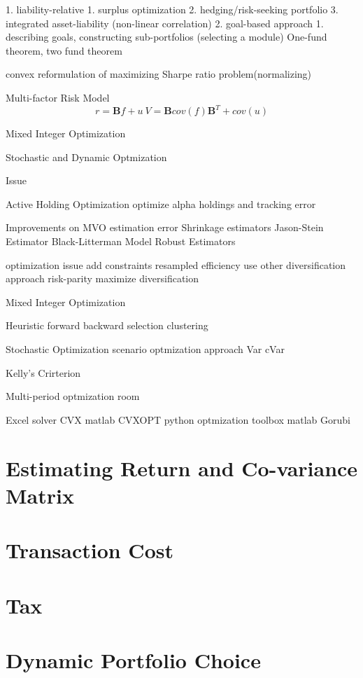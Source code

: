 \documentclass[11pt, openany]{book}              %
\begin{document}
    1. liability-relative
        1. surplus optimization
        2. hedging/risk-seeking portfolio
        3. integrated asset-liability (non-linear correlation)
    2. goal-based approach
        1. describing goals, constructing sub-portfolios (selecting a module)
  One-fund theorem, two fund theorem 


   convex reformulation of maximizing Sharpe ratio problem(normalizing) 


  Multi-factor Risk Model 
    $$r = \mathbf{B}f + u ~ V = \mathbf{B}cov(f)\mathbf{B}^T + cov(u)$$ 
   
   Mixed Integer Optimization


   Stochastic and Dynamic Optmization


Issue 


	Active Holding Optimization
              optimize alpha holdings and tracking error



Improvements on MVO
   estimation error
  	Shrinkage estimators
		Jason-Stein Estimator  
	Black-Litterman Model
	Robust Estimators

    optimization issue
	add constraints
	resampled efficiency
	use other diversification approach 
		risk-parity 
  		maximize diversification		




Mixed Integer Optimization

Heuristic
  forward
  backward selection
  clustering


Stochastic Optimization
scenario optmization approach
Var
cVar

 Kelly’s Crirterion 

Multi-period optmization room




Excel solver
 CVX matlab
CVXOPT python
optmization toolbox matlab
Gorubi




\section{Estimating Return and Co-variance Matrix}
\section{Transaction Cost}
\section{Tax}
\section{Dynamic Portfolio Choice}
\end{document}
